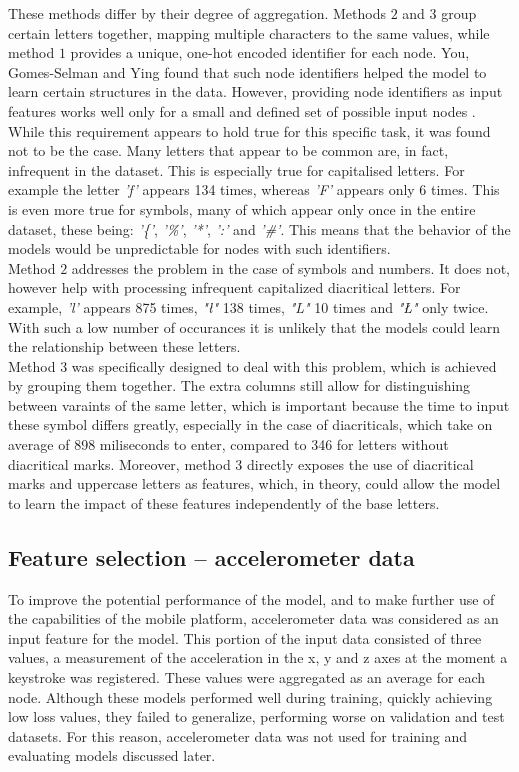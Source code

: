 These methods differ by their degree of aggregation. Methods $2$ and $3$ group certain letters together, mapping multiple characters to the same values, while method $1$ provides a unique, one-hot encoded identifier for each node. You, Gomes-Selman and Ying \cite{you2021identityawaregraphneuralnetworks}
found that such node identifiers helped the model to learn certain structures in the data. However, providing node identifiers as input features works well only for a small and defined set of possible input nodes \cite{Lesk2024}. While this requirement appears to hold true for this specific task, it was found not to be the case.
Many letters that appear to be common are, in fact, infrequent in the dataset. This is especially true for capitalised letters. For example the letter \textit{'f'} appears 134 times, whereas \textit{'F'} appears only 6 times. This is even more true for symbols, many of which appear only once in the entire dataset, these being: \textit{'\{'}, \textit{'\%'}, \textit{'*'}, \textit{':'} and \textit{'\#'}.
This means that the behavior of the models would be unpredictable for nodes with such identifiers.\\
Method $2$ addresses the problem in the case of symbols and numbers. It does not, however help with processing infrequent capitalized diacritical letters. For example, \textit{'l'} appears 875 times, \textit{"ł"} 138 times, \textit{"L"} 10 times and \textit{"Ł"} only twice. With such a low number of occurances it is unlikely that the models could learn the relationship between these letters. \\
Method $3$ was specifically designed to deal with this problem, which is achieved by grouping them together. The extra columns still allow for distinguishing between varaints of the same letter, which is important because the time to input these symbol differs greatly, especially in the case of diacriticals, which take on average of 898 miliseconds to enter, compared to 346 for letters without diacritical marks.
Moreover, method $3$ directly exposes the use of diacritical marks and uppercase letters as features, which, in theory, could allow the model to learn the impact of these features independently of the base letters. 

\subsection{Feature selection -- accelerometer data} \label{accel_subsection}
To improve the potential performance of the model, and to make further use of the capabilities of the mobile platform, accelerometer data was considered as an input feature for the model. %
This portion of the input data consisted of three values, a measurement of the acceleration in the x, y and z axes at the moment a keystroke was registered. 
These values were aggregated as an average for each node. Although these models performed well during training, quickly achieving low loss values, they failed to generalize, performing worse on validation and test datasets. For this reason, accelerometer data was not used for training and evaluating models discussed later.

